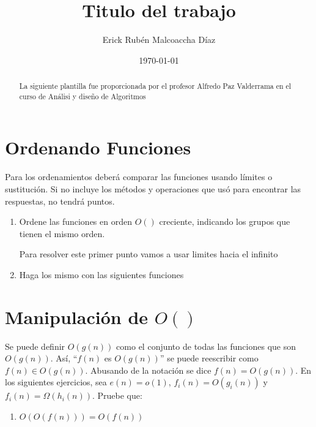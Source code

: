 \documentclass{practicaEPCC}
\title{Titulo del trabajo}
\author{Erick Rubén Malcoaccha Díaz}
\date{\today}
\begin{document}
\maketitle
\begin{abstract}
La siguiente plantilla fue proporcionada por el profesor Alfredo Paz Valderrama en el curso de Análisi y diseño de Algoritmos
    
\end{abstract}
\section{Ordenando Funciones}
Para los ordenamientos deberá comparar las funciones usando límites o sustitución. Si no incluye los métodos y operaciones que usó para encontrar las respuestas, no tendrá puntos.
\begin{enumerate}
  \item Ordene las funciones en orden $O()$ creciente, indicando los grupos que tienen el mismo orden.

    Para resolver este primer punto vamos a usar limites hacia el infinito
    \item Haga los mismo con las siguientes funciones

\end{enumerate}

\section{Manipulación de $O()$}
Se puede definir $O(g(n))$ como el conjunto de todas las funciones que son $O(g(n))$. Así, ``$f(n)$ es $O(g(n))$'' se puede reescribir como $f(n) \in O(g(n))$. Abusando de la notación se dice $f(n)=O(g(n))$.
En los siguientes ejercicios, sea $e(n) = o(1)$, $f_i(n) = O(g_i(n))$ y $f_i(n) = \Omega(h_i(n))$. Pruebe que:

\begin{enumerate}
    \item $O(O(f(n))) = O(f(n))$
\end{enumerate}
\end{document}
